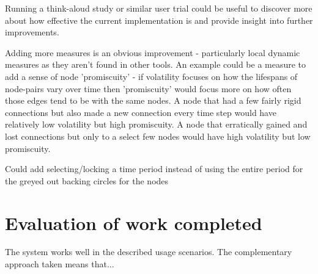 Running a think-aloud study or similar user trial could be useful to discover more about how effective the current implementation is and provide insight into further improvements.
\newline

Adding more measures is an obvious improvement - particularly local dynamic measures as they aren't found in other tools. An example could be a measure to add a sense of node 'promiscuity' - if volatility focuses on how the lifespans of node-pairs vary over time then 'promiscuity' would focus more on how often those edges tend to be with the same nodes. A node that had a few fairly rigid connections but also made a new connection every time step would have relatively low volatility but high promiscuity. A node that erratically gained and lost connections but only to a select few nodes would have high volatility but low promiscuity.

Could add selecting/locking a time period instead of using the entire period for the greyed out backing circles for the nodes

\section{Evaluation of work completed} 
The system works well in the described usage scenarios. The complementary approach taken means that...
